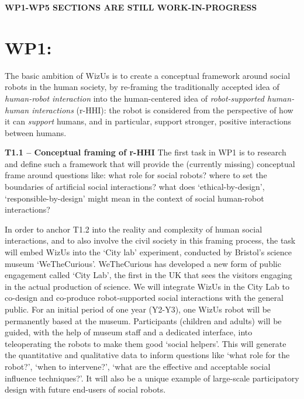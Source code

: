 \documentclass[11pt,a4paper]{report}
\newcommand{\project}{WizUs\xspace}
\newcommand{\TODO}[1]{{\color{red}\textbf{#1}}}
\begin{document}

\begin{figure}[!ht]
\resizebox{\linewidth}{!}{
    
}
\end{figure}



\TODO{WP1-WP5 SECTIONS ARE STILL WORK-IN-PROGRESS}

\section{WP1: \textbf{\wpOne}}

The basic ambition of \project is to create a conceptual framework around social
robots in the human society, by re-framing the traditionally accepted idea of
\emph{human-robot interaction} into the human-centered idea of
\emph{robot-supported human-human interactions} (r-HHI): the robot is considered
from the perspective of how it can \emph{support} humans, and in particular,
support stronger, positive interactions between humans.

\textbf{T1.1 -- Conceptual framing of r-HHI} The first task in WP1 is to
research and define such a framework that will provide the (currently missing)
conceptual frame around questions like: what role for social robots? where to
set the boundaries of artificial social interactions? what does
`ethical-by-design', `responsible-by-design' might mean in the context of social
human-robot interactions? 

In order to anchor T1.2 into the reality and complexity of human social
interactions, and to also involve the civil society in this framing process, the
task will embed \project into the `City lab' experiment, conducted by Bristol's
science museum `WeTheCurious'. WeTheCurious has developed a new form of
public engagement called `City Lab', the first in the UK that sees the visitors
engaging in the actual production of science. We will integrate \project in the
City Lab to co-design and co-produce robot-supported social interactions with
the general public. For an initial period of one year (Y2-Y3), one \project
robot will be permanently based at the museum.  Participants (children and
adults) will be guided, with the help of museum staff and a dedicated interface,
into teleoperating the robots to make them good `social helpers'. This will
generate the quantitative and qualitative data to inform questions like `what
role for the robot?', `when to intervene?', `what are the effective and
acceptable social influence techniques?'. It will also be a unique example of
large-scale participatory design with future end-users of social robots.
\end{document}
